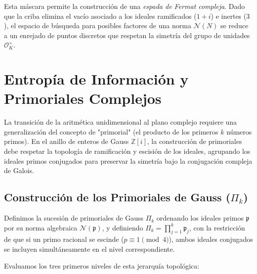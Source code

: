\documentclass[12pt, a4paper]{article}
\theoremstyle{plain}
\theoremstyle{definition}
\theoremstyle{remark}
\newcommand{\Z}{\mathbb{Z}}
\newcommand{\OK}{\mathcal{O}_K}
\newcommand{\Norm}{\mathcal{N}}
\begin{document}
Esta máscara permite la construcción de una \textit{espada de Fermat compleja}. Dado que la criba elimina el vacío asociado a los ideales ramificados ($1+i$) e inertes ($3$), el espacio de búsqueda para posibles factores de una norma $\Norm(N)$ se reduce a un enrejado de puntos discretos que respetan la simetría del grupo de unidades $\OK^\times$. 

\section{Entropía de Información y Primoriales Complejos}
\label{sec:entropia}

La transición de la aritmética unidimensional al plano complejo requiere una generalización del concepto de "primorial" (el producto de los primeros $k$ números primos). En el anillo de enteros de Gauss $\Z[i]$, la construcción de primoriales debe respetar la topología de ramificación y escisión de los ideales, agrupando los ideales primos conjugados para preservar la simetría bajo la conjugación compleja de Galois.

\subsection{Construcción de los Primoriales de Gauss (\texorpdfstring{$\Pi_k$}{Pi\_k})}

Definimos la sucesión de primoriales de Gauss $\Pi_k$ ordenando los ideales primos $\mathfrak{p}$ por su norma algebraica $\Norm(\mathfrak{p})$, y definiendo $\Pi_k = \prod_{j=1}^k \mathfrak{p}_j$, con la restricción de que si un primo racional se escinde ($p \equiv 1 \pmod 4$), ambos ideales conjugados se incluyen simultáneamente en el nivel correspondiente.

Evaluamos los tres primeros niveles de esta jerarquía topológica:
\end{document}
